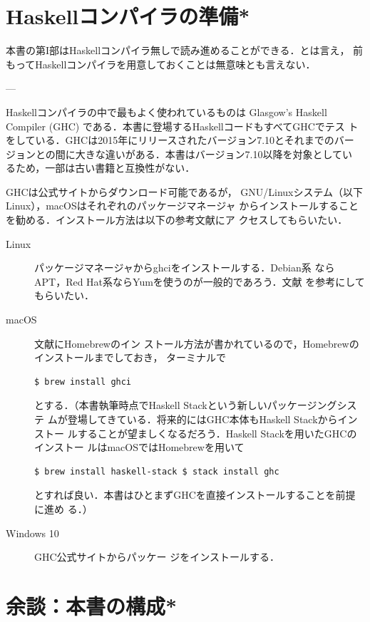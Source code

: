 \documentclass[a5paper,twoside,fleqn]{jsbook}
\newcommand{\programminglanguage}[1]{\textsf{#1}}
\newcommand{\clangkr}{\programminglanguage{K\&R~C}}
\newcommand{\haskell}{\programminglanguage{Haskell}}
\newcommand{\code}[1]{\texttt{#1}}
\begin{document}


\section{\haskell コンパイラの準備*}

本書の第I部は\haskell コンパイラ無しで読み進めることができる．とは言え，
前もって\haskell コンパイラを用意しておくことは無意味とも言えない．

---

\haskell コンパイラの中で最もよく使われているものは Glasgow's Haskell
Compiler (GHC) である．本書に登場する\haskell コードもすべてGHCでテス
トをしている．GHCは2015年にリリースされたバージョン7.10とそれまでのバー
ジョンとの間に大きな違いがある．本書はバージョン7.10以降を対象としてい
るため，一部は古い書籍と互換性がない．

GHCは公式サイト\cite{haskellplatform}からダウンロード可能であるが，
GNU/Linuxシステム（以下Linux），macOSはそれぞれのパッケージマネージャ
からインストールすることを勧める．インストール方法は以下の参考文献にア
クセスしてもらいたい．
\begin{description}
\item[Linux] パッケージマネージャからghciをインストールする．Debian系
  ならAPT，Red Hat系ならYumを使うのが一般的であろう．文献\cite{linux}
  を参考にしてもらいたい．\item[macOS] 文献\cite{osx}にHomebrewのイン
  ストール方法が書かれているので，Homebrewのインストールまでしておき，
  ターミナルで
\begin{verbatim}
$ brew install ghci
\end{verbatim} %
とする．（本書執筆時点でHaskell Stackという新しいパッケージングシステ
  ムが登場してきている．将来的にはGHC本体もHaskell Stackからインストー
  ルすることが望ましくなるだろう．Haskell Stackを用いたGHCのインストー
  ルはmacOSではHomebrewを用いて
\begin{verbatim}
$ brew install haskell-stack $ stack install ghc
\end{verbatim} %
とすれば良い．本書はひとまずGHCを直接インストールすることを前提に進め
る．）\item[Windows 10] GHC公式サイト\cite{haskellplatform}からパッケー
ジをインストールする．
\end{description}


\section{余談：本書の構成*}
\end{document}
